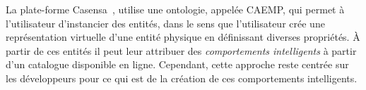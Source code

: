 La plate-forme Casensa~\parencite{criel2011deconstructing}, utilise une ontologie, 
appelée CAEMP, qui permet à l'utilisateur d'instancier des entités, dans le sens
que l'utilisateur crée une représentation virtuelle d'une entité physique en 
définissant diverses propriétés. À partir de ces entités il peut leur attribuer 
des {\em comportements intelligents} à partir d'un catalogue disponible en 
ligne. Cependant, cette approche reste centrée sur les développeurs pour ce qui 
est de la création de ces comportements intelligents.



